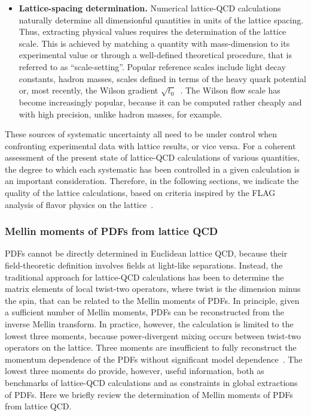 \begin{itemize}
\item {\bfseries Lattice-spacing determination.} 
Numerical lattice-QCD calculations 
naturally determine all dimensionful quantities in units of the
lattice spacing. Thus, extracting physical values requires the
determination of the lattice scale. This is achieved by matching a
quantity with mass-dimension to its experimental value or through a
well-defined theoretical procedure, that is referred to as
``scale-setting''. Popular reference scales include light decay
constants, hadron masses, scales defined in terms of the heavy quark
potential or, most recently, the Wilson gradient
$\sqrt{t_0}$~\cite{Luscher:2010iy}. The Wilson flow scale has become
increasingly popular, because it can be computed rather cheaply and
with high precision, unlike hadron masses, for example.

\end{itemize}

These sources of systematic uncertainty all need to be under control
when confronting experimental data with lattice results, or vice
versa.
%
For a coherent assessment of the present state of lattice-QCD
calculations of various quantities, the degree to which each
systematic has been controlled in a given calculation is an important
consideration.
%
Therefore, in the following sections, we indicate the
quality of the lattice calculations, based on criteria inspired by the
FLAG analysis of flavor physics on the lattice~\cite{Aoki:2016frl}.

\subsubsection{Mellin moments of PDFs from lattice QCD}
\label{Sec:MomentsLQCD}

PDFs cannot be directly determined in Euclidean lattice QCD, because their 
field-theoretic definition involves fields at light-like separations.
%
Instead, 
the traditional approach for lattice-QCD calculations has been to determine the matrix elements of local twist-two operators, where twist is the dimension minus the spin, that can be related to the Mellin moments of PDFs.
%
In principle, given a sufficient number of Mellin moments, PDFs can be reconstructed from the inverse Mellin transform. In practice, however, the calculation is limited to the lowest three moments, because power-divergent mixing occurs between twist-two operators on the lattice.
%
Three moments are insufficient to fully reconstruct the momentum dependence of the PDFs without significant model dependence~\cite{Detmold:2003rq}.
%
The lowest three moments do provide, however, useful information, both as benchmarks of lattice-QCD calculations and as constraints in global extractions of PDFs. Here we briefly review the determination of Mellin moments of PDFs from lattice QCD. 

